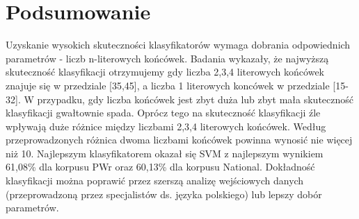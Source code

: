 \section{Podsumowanie}
Uzyskanie wysokich skuteczności klasyfikatorów wymaga dobrania odpowiednich parametrów - liczb n-literowych końcówek. Badania wykazały, że najwyższą skuteczność klasyfikacji otrzymujemy gdy liczba 2,3,4 literowych końcówek znajuje się w przedziale [35,45], a liczba 1 literowych koncówek w przedziale [15-32]. W przypadku, gdy liczba końcówek jest zbyt duża lub zbyt mała skuteczność klasyfikacji gwałtownie spada. Oprócz tego na skuteczność klasyfikacji źle wpływają duże różnice między liczbami 2,3,4 literowych końcówek. Według przeprowadzonych różnica dwoma liczbami końcówek powinna wynosić nie więcej niż 10. Najlepszym klasyfikatorem okazał się SVM z najlepszym wynikiem 61,08\% dla korpusu PWr oraz 60,13\% dla korpusu National. Dokładność klasyfikacji można poprawić przez szerszą analizę wejściowych danych (przeprowadzoną przez specjalistów ds. języka polskiego) lub lepszy dobór parametrów.  

